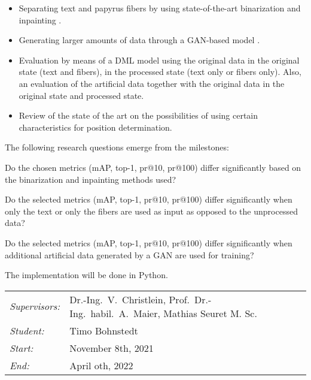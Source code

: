 \documentclass[12pt,a4paper]{article}
\begin{document}
\begin{itemize}
	\item Separating text and papyrus fibers by using state-of-the-art binarization \cite{Tensmeyer20} and inpainting \cite{Liu18Impainting}.
	
	\item Generating larger amounts of data through a GAN-based model \cite{Goodfellow14, Tamrin21}.
	
	\item  Evaluation by means of a DML model using the original data in the original state (text and fibers), in the processed state (text only or fibers only). Also, an evaluation of the artificial data together with the original data in the original state and processed state.
	
	\item Review of the state of the art on the possibilities of using certain characteristics for position determination.      	      	      
\end{itemize}
		
The following research questions emerge from the milestones:

\begin{questions}
	\item Do the chosen metrics (mAP, top-1, pr@10, pr@100) differ significantly based on the binarization and inpainting methods used?
	
	\item  Do the selected metrics (mAP, top-1, pr@10, pr@100) differ significantly when only the text or only the fibers are used as input as opposed to the unprocessed data?  
	
	\item  Do the selected metrics (mAP, top-1, pr@10, pr@100) differ significantly when additional artificial data generated by a GAN are used for training?
\end{questions}

		
The implementation will be done in Python.\\
		
\begin{tabular}{ll}
	\emph{Supervisors:} & Dr.-Ing.~V.~Christlein,  Prof.~Dr.-Ing.~habil.~A.~Maier, Mathias Seuret M. Sc.
	\\
	\emph{Student:}     & Timo Bohnstedt
	\\
	\emph{Start:}       & November 8th, 2021                                            \\
	\emph{End:}         & April oth, 2022                                        \\
\end{tabular}
\nopagebreak[4]
\small

		
\end{document}
